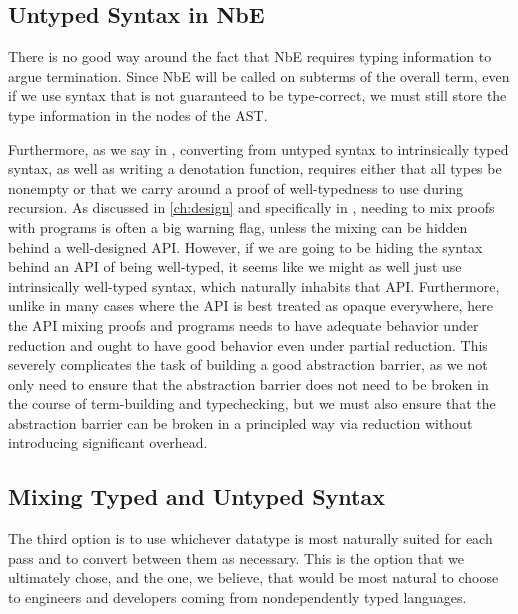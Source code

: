 \subsection{Untyped Syntax in NbE}\label{sec:rewriting-more:AST:untyped-nbe}
There is no good way around the fact that NbE requires typing information to argue termination.
Since NbE will be called on subterms of the overall term, even if we use syntax that is not guaranteed to be type-correct, we must still store the type information in the nodes of the AST.

Furthermore, as we say in , converting from untyped syntax to intrinsically typed syntax, as well as writing a denotation function, requires either that all types be nonempty or that we carry around a proof of well-typedness to use during recursion.
As discussed in \autoref{ch:design} and specifically in , needing to mix proofs with programs is often a big warning flag, unless the mixing can be hidden behind a well-designed API.
However, if we are going to be hiding the syntax behind an API of being well-typed, it seems like we might as well just use intrinsically well-typed syntax, which naturally inhabits that API.
Furthermore, unlike in many cases where the API is best treated as opaque everywhere, here the API mixing proofs and programs needs to have adequate behavior under reduction and ought to have good behavior even under partial reduction.
This severely complicates the task of building a good abstraction barrier, as we not only need to ensure that the abstraction barrier does not need to be broken in the course of term-building and typechecking, but we must also ensure that the abstraction barrier can be broken in a principled way via reduction without introducing significant overhead.


\subsection{Mixing Typed and Untyped Syntax}\label{sec:rewriting-more:AST:both}
The third option is to use whichever datatype is most naturally suited for each pass and to convert between them as necessary.
This is the option that we ultimately chose, and the one, we believe, that would be most natural to choose to engineers and developers coming from nondependently typed languages.

